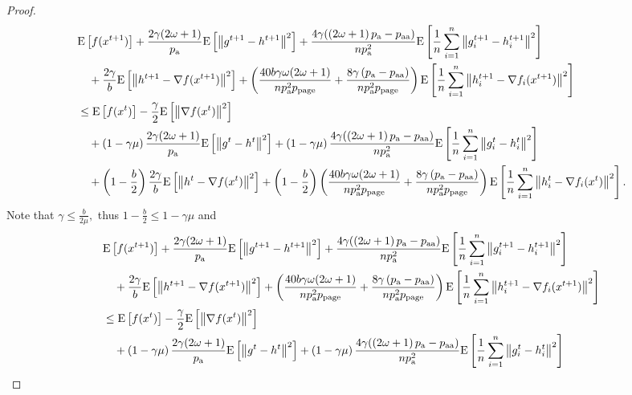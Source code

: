 \documentclass{article}
\newcommand*{\probavailable}{\ensuremath{p_{\textnormal{a}}}}
\newcommand*{\probpairaa}{\ensuremath{p_{\textnormal{aa}}}}
\newcommand*{\probpage}{\ensuremath{p_{\text{page}}}}
\begin{document}
\begin{proof}
    \begin{align*}
      &\Exp{f(x^{t + 1})} + \frac{2\gamma (2 \omega + 1)}{\probavailable} \Exp{\norm{g^{t+1} - h^{t+1}}^2} + \frac{4 \gamma (\left(2 \omega + 1\right)\probavailable - \probpairaa)}{n \probavailable^2} \Exp{\frac{1}{n}\sum_{i=1}^n\norm{g^{t+1}_i - h^{t+1}_i}^2}\\
      &\quad  + \frac{2\gamma}{b} \Exp{\norm{h^{t+1} - \nabla f(x^{t+1})}^2} + \left(\frac{40 b \gamma \omega (2 \omega + 1)}{n \probavailable^2 \probpage} + \frac{8 \gamma \left(\probavailable - \probpairaa\right)}{n \probavailable^2 \probpage}\right) \Exp{\frac{1}{n}\sum_{i=1}^n\norm{h^{t+1}_i - \nabla f_i(x^{t+1})}^2}\\
      &\leq \Exp{f(x^t)} - \frac{\gamma}{2}\Exp{\norm{\nabla f(x^t)}^2} \\
      &\quad + \left(1 - \gamma \mu\right)\frac{2 \gamma (2 \omega + 1)}{\probavailable} \Exp{\norm{g^{t} - h^{t}}^2} + \left(1 - \gamma \mu\right)\frac{4 \gamma (\left(2 \omega + 1\right)\probavailable - \probpairaa)}{n \probavailable^2} \Exp{\frac{1}{n}\sum_{i=1}^n\norm{g^{t}_i - h^{t}_i}^2} \\
      &\quad + \left(1 - \frac{b}{2}\right)\frac{2\gamma}{b}\Exp{\norm{h^{t} - \nabla f(x^{t})}^2} + \left(1 - \frac{b}{2}\right)\left(\frac{40 b \gamma \omega (2 \omega + 1)}{n \probavailable^2 \probpage} + \frac{8 \gamma \left(\probavailable - \probpairaa\right)}{n \probavailable^2 \probpage}\right)\Exp{\frac{1}{n}\sum_{i=1}^n\norm{h^{t}_i - \nabla f_i(x^{t})}^2}.
    \end{align*}
    Note that $\gamma \leq \frac{b}{2\mu},$ thus $1 - \frac{b}{2} \leq 1 - \gamma \mu$ and 
    \begin{align*}
      &\Exp{f(x^{t + 1})} + \frac{2\gamma (2 \omega + 1)}{\probavailable} \Exp{\norm{g^{t+1} - h^{t+1}}^2} + \frac{4 \gamma (\left(2 \omega + 1\right)\probavailable - \probpairaa)}{n \probavailable^2} \Exp{\frac{1}{n}\sum_{i=1}^n\norm{g^{t+1}_i - h^{t+1}_i}^2}\\
      &\quad  + \frac{2\gamma}{b} \Exp{\norm{h^{t+1} - \nabla f(x^{t+1})}^2} + \left(\frac{40 b \gamma \omega (2 \omega + 1)}{n \probavailable^2 \probpage} + \frac{8 \gamma \left(\probavailable - \probpairaa\right)}{n \probavailable^2 \probpage}\right) \Exp{\frac{1}{n}\sum_{i=1}^n\norm{h^{t+1}_i - \nabla f_i(x^{t+1})}^2}\\
      &\leq \Exp{f(x^t)} - \frac{\gamma}{2}\Exp{\norm{\nabla f(x^t)}^2} \\
      &\quad + \left(1 - \gamma \mu\right)\frac{2 \gamma (2 \omega + 1)}{\probavailable} \Exp{\norm{g^{t} - h^{t}}^2} + \left(1 - \gamma \mu\right)\frac{4 \gamma (\left(2 \omega + 1\right)\probavailable - \probpairaa)}{n \probavailable^2} \Exp{\frac{1}{n}\sum_{i=1}^n\norm{g^{t}_i - h^{t}_i}^2} \\

\end{align*}
\end{proof}
\end{document}
